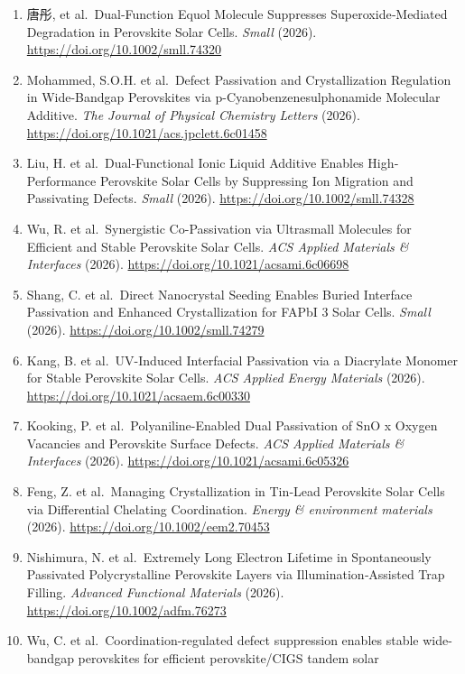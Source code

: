 \documentclass[
  11pt,
]{article}
\begin{document}
\begin{enumerate}
{  Materials \& Interfaces} (2026).
  \url{https://doi.org/10.1021/acsami.6c04650}
\item
  唐彤, et al.~Dual‐Function Equol Molecule Suppresses
  Superoxide‐Mediated Degradation in Perovskite Solar Cells.
  \emph{Small} (2026). \url{https://doi.org/10.1002/smll.74320}
\item
  Mohammed, S.O.H. et al.~Defect Passivation and Crystallization
  Regulation in Wide-Bandgap Perovskites via p-Cyanobenzenesulphonamide
  Molecular Additive. \emph{The Journal of Physical Chemistry Letters}
  (2026). \url{https://doi.org/10.1021/acs.jpclett.6c01458}
\item
  Liu, H. et al.~Dual‐Functional Ionic Liquid Additive Enables
  High‐Performance Perovskite Solar Cells by Suppressing Ion Migration
  and Passivating Defects. \emph{Small} (2026).
  \url{https://doi.org/10.1002/smll.74328}
\item
  Wu, R. et al.~Synergistic Co-Passivation via Ultrasmall Molecules for
  Efficient and Stable Perovskite Solar Cells. \emph{ACS Applied
  Materials \& Interfaces} (2026).
  \url{https://doi.org/10.1021/acsami.6c06698}
\item
  Shang, C. et al.~Direct Nanocrystal Seeding Enables Buried Interface
  Passivation and Enhanced Crystallization for FAPbI 3 Solar Cells.
  \emph{Small} (2026). \url{https://doi.org/10.1002/smll.74279}
\item
  Kang, B. et al.~UV-Induced Interfacial Passivation via a Diacrylate
  Monomer for Stable Perovskite Solar Cells. \emph{ACS Applied Energy
  Materials} (2026). \url{https://doi.org/10.1021/acsaem.6c00330}
\item
  Kooking, P. et al.~Polyaniline-Enabled Dual Passivation of SnO x
  Oxygen Vacancies and Perovskite Surface Defects. \emph{ACS Applied
  Materials \& Interfaces} (2026).
  \url{https://doi.org/10.1021/acsami.6c05326}
\item
  Feng, Z. et al.~Managing Crystallization in Tin‐Lead Perovskite Solar
  Cells via Differential Chelating Coordination. \emph{Energy \&
  environment materials} (2026).
  \url{https://doi.org/10.1002/eem2.70453}
\item
  Nishimura, N. et al.~Extremely Long Electron Lifetime in Spontaneously
  Passivated Polycrystalline Perovskite Layers via Illumination‐Assisted
  Trap Filling. \emph{Advanced Functional Materials} (2026).
  \url{https://doi.org/10.1002/adfm.76273}
\item
  Wu, C. et al.~Coordination-regulated defect suppression enables stable
  wide-bandgap perovskites for efficient perovskite/CIGS tandem solar

\end{enumerate}
\end{document}
